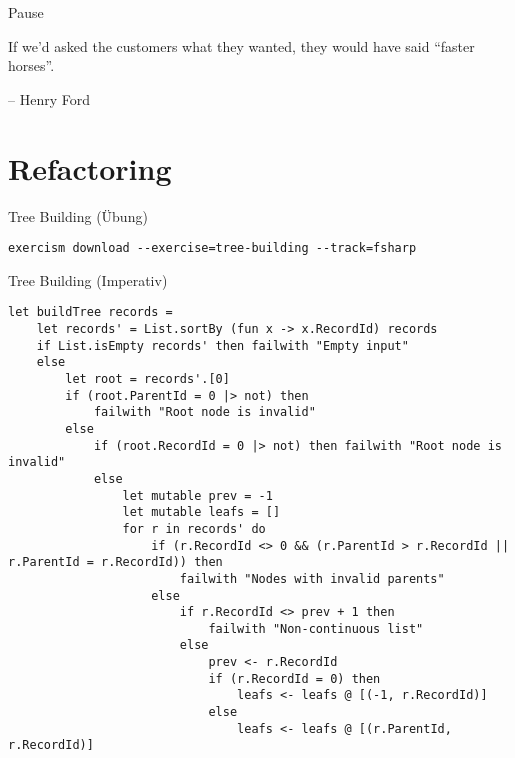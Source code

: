 \documentclass[t]{beamer}
\begin{document}
\begin{frame}[label={sec:org6c5a8a0}]{Pause}
\begin{block}{}
If we’d asked the customers what they wanted, they would have said “faster horses”.

\null\hfill -- Henry Ford
\end{block}
\end{frame}

\section{Refactoring }
\label{sec:org52cdd10}
\begin{frame}[label={sec:org42bb9c4},fragile]{Tree Building (Übung)}
 \begin{verbatim}
exercism download --exercise=tree-building --track=fsharp
\end{verbatim}
\end{frame}

\begin{frame}[label={sec:org2cdbc3a},fragile]{Tree Building (Imperativ)}
 \begin{verbatim}
let buildTree records =
    let records' = List.sortBy (fun x -> x.RecordId) records
    if List.isEmpty records' then failwith "Empty input"
    else
        let root = records'.[0]
        if (root.ParentId = 0 |> not) then
            failwith "Root node is invalid"
        else
            if (root.RecordId = 0 |> not) then failwith "Root node is invalid"
            else
                let mutable prev = -1
                let mutable leafs = []
                for r in records' do
                    if (r.RecordId <> 0 && (r.ParentId > r.RecordId || r.ParentId = r.RecordId)) then
                        failwith "Nodes with invalid parents"
                    else
                        if r.RecordId <> prev + 1 then
                            failwith "Non-continuous list"
                        else
                            prev <- r.RecordId
                            if (r.RecordId = 0) then
                                leafs <- leafs @ [(-1, r.RecordId)]
                            else
                                leafs <- leafs @ [(r.ParentId, r.RecordId)]
\end{verbatim}
\end{frame}
\end{document}
